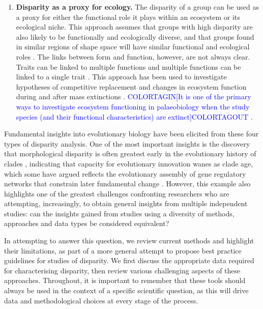 \documentclass[12pt,letterpaper]{article}
\begin{document}
\begin{enumerate}
	\item \textbf{Disparity as a proxy for ecology.} The disparity of a group can be used as a proxy for either the functional role it plays within an ecosystem or its ecological niche.
	This approach assumes that groups with high disparity are also likely to be functionally and ecologically diverse, and that groups found in similar regions of shape space will have similar functional and ecological roles \citep{Pierce2008, Friedman2010}.
	The links between form and function, however, are not always clear.
	Traits can be linked to multiple functions and multiple functions can be linked to a single trait \citep{Wainwright2005}.
	This approach has been used to investigate hypotheses of competitive replacement \citep{tyler2011detecting} and changes in ecosystem function during and after mass extinctions \citep{Friedman2010}.
    \textcolor{blue}{COLORTAGIN[It is one of the primary ways to investigate ecosystem functioning in palaeobiology when the study species (and their functional characteristics) are extinct]COLORTAGOUT} \citep{Wainwright2005}.

\end{enumerate}

Fundamental insights into evolutionary biology have been elicited from these four types of disparity analysis.
One of the most important insights is the discovery that morphological disparity is often greatest early in the evolutionary history of clades \citep{Foote1997, Erwin2007, Hughes2013}, indicating that capacity for evolutionary innovation wanes as clade age, which some have argued reflects the evolutionary assembly of gene regulatory networks that constrain later fundamental change \citep{Erwin2007, Hughes2013}.
However, this example also highlights one of the greatest challenges confronting researchers who are attempting, increasingly, to obtain general insights from multiple independent studies: can the insights gained from studies using a diversity of methods, approaches and data types be considered equivalent?

In attempting to answer this question, we review current methods and highlight their limitations, as part of a more general attempt to propose best practice guidelines for studies of disparity.
We first discuss the appropriate data required for characterising disparity, then review various challenging aspects of these approaches.
Throughout, it is important to remember that these tools should always be used in the context of a specific scientific question, as this will drive data and methodological choices at every stage of the process.
\end{document}
